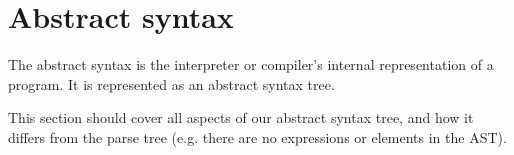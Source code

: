 \section{Abstract syntax}

The abstract syntax is the interpreter or compiler's internal representation of a program. It is represented
as an abstract syntax tree.

This section should cover all aspects of our abstract syntax tree, and how it differs from the
parse tree (e.g. there are no expressions or elements in the AST).


